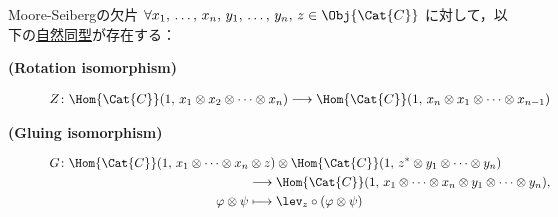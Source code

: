 \documentclass[TQFT_main]{subfiles}
\begin{document}
\begin{mylem}[label=lem:MS]{Moore-Seibergの欠片}
    $\forall x_1,\, \dots,\, x_n,\, y_1,\, \dots,\, y_n,\, z \in \Obj{\Cat{C}}$ に対して，以下の\hyperref[def:nat]{自然同型}が存在する：
    \begin{description}
        \item[\textbf{(Rotation isomorphism)}]
        \begin{align}
            Z \colon \Hom{\Cat{C}} (1,\, x_1 \otimes x_2 \otimes \cdots \otimes x_n) \lto \Hom{\Cat{C}} (1,\, x_n \otimes x_1 \otimes \cdots \otimes x_{n-1})
        \end{align}
        
        \item[\textbf{(Gluing isomorphism)}]
        \begin{align}
            G \colon \Hom{\Cat{C}} (1,\, x_1 \otimes \cdots \otimes x_n &\otimes z) \otimes  \Hom{\Cat{C}}(1,\, z^* \otimes y_1 \otimes \cdots \otimes y_n) \\
            &\lto \Hom{\Cat{C}} (1,\, x_1\otimes \cdots \otimes x_{n} \otimes y_1 \otimes \cdots \otimes y_n), \\
            \varphi \otimes \psi &\lmto \lev_z \circ (\varphi \otimes \psi)
        \end{align}
        
    \end{description}
    
\end{mylem}
\end{document}
